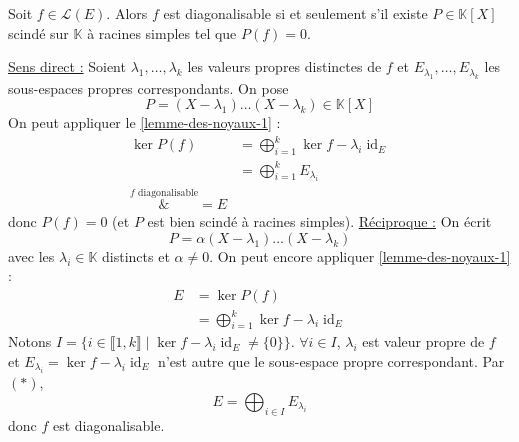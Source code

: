 	\begin{application}
		Soit $f \in \mathcal{L}(E)$. Alors $f$ est diagonalisable si et seulement s'il existe $P \in \mathbb{K}[X]$ scindé sur $\mathbb{K}$ à racines simples tel que $P(f) = 0$.
	\end{application}

	\begin{demonstration}
		\underline{Sens direct :} Soient $\lambda_1, \dots, \lambda_k$ les valeurs propres distinctes de $f$ et $E_{\lambda_1}, \dots, E_{\lambda_k}$ les sous-espaces propres correspondants. On pose
		\[ P = (X-\lambda_1) \dots (X-\lambda_k) \in \mathbb{K}[X] \]
		On peut appliquer le \cref{lemme-des-noyaux-1} :
		\begin{align*}
			\ker{P(f)} &= \bigoplus_{i = 1}^k \ker{f - \lambda_i \operatorname{id}_E} \\
			&= \bigoplus_{i = 1}^k E_{\lambda_i} \\
			\overset{f \text{ diagonalisable}}&{=} E
		\end{align*}
		donc $P(f) = 0$ (et $P$ est bien scindé à racines simples).
		\newpar
		\underline{Réciproque :} On écrit
		\[ P = \alpha (X-\lambda_1) \dots (X-\lambda_k) \]
		avec les $\lambda_i \in \mathbb{K}$ distincts et $\alpha \neq 0$. On peut encore appliquer \cref{lemme-des-noyaux-1} :
		\begin{align*}
			E &= \ker{P(f)} \\
			&= \bigoplus_{i = 1}^k \ker{f - \lambda_i \operatorname{id}_E} \tag{*}
		\end{align*}
		Notons $I = \{ i \in \llbracket 1, k \rrbracket \mid \ker{f - \lambda_i \operatorname{id}_E} \neq \{ 0 \} \}$. $\forall i \in I$, $\lambda_i$ est valeur propre de $f$ et $E_{\lambda_i} = \ker{f - \lambda_i \operatorname{id}_E}$ n'est autre que le sous-espace propre correspondant. Par $(*)$,
		\[ E = \bigoplus_{i \in I} E_{\lambda_i} \]
		donc $f$ est diagonalisable.
	\end{demonstration}

